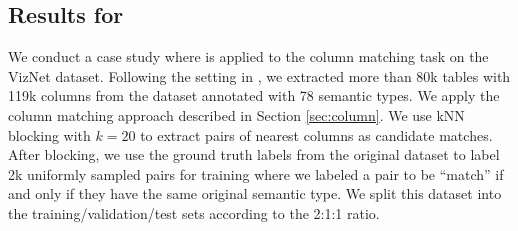 \subsection{Results for }\label{sec:coltype}

We conduct a case study where \system is applied to the column matching task on the VizNet dataset.
Following the setting in \cite{DBLP:journals/pvldb/ZhangSLHDT20}, we extracted more than 80k tables with 119k columns 
from the dataset annotated with 78 semantic types.
We apply the column matching approach described in Section \ref{sec:column}.
We use kNN blocking with $k=20$ to extract pairs of nearest columns as candidate matches.
After blocking, we use the ground truth labels 
from the original dataset to label 2k uniformly sampled pairs 
for training where we labeled a pair to be ``match'' 
if and only if they have the same original semantic type.
We split this dataset into the training/validation/test sets according to the 2:1:1 ratio.


